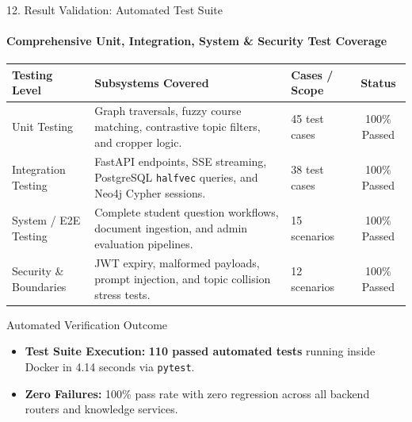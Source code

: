 \documentclass[aspectratio=169, 11pt]{beamer}
\begin{document}
\begin{frame}{12. Result Validation: Automated Test Suite}
    \framesubtitle{Comprehensive Unit, Integration, System \& Security Test Coverage}
    \begin{table}
        \centering
        \footnotesize
        \renewcommand{\arraystretch}{1.20}
        \begin{tabular}{p{2.8cm} p{4.6cm} p{2.6cm} c}
            \toprule
            \textbf{Testing Level} & \textbf{Subsystems Covered} & \textbf{Cases / Scope} & \textbf{Status} \\
            \midrule
            Unit Testing & Graph traversals, fuzzy course matching, contrastive topic filters, and cropper logic. & 45 test cases & 100\% Passed \\
            Integration Testing & FastAPI endpoints, SSE streaming, PostgreSQL \texttt{halfvec} queries, and Neo4j Cypher sessions. & 38 test cases & 100\% Passed \\
            System / E2E Testing & Complete student question workflows, document ingestion, and admin evaluation pipelines. & 15 scenarios & 100\% Passed \\
            Security \& Boundaries & JWT expiry, malformed payloads, prompt injection, and topic collision stress tests. & 12 scenarios & 100\% Passed \\
            \bottomrule
        \end{tabular}
    \end{table}

    \begin{block}{Automated Verification Outcome}
        \footnotesize
        \begin{itemize}
            \item \textbf{Test Suite Execution:} \textbf{110 passed automated tests} running inside Docker in 4.14 seconds via \texttt{pytest}.
            \item \textbf{Zero Failures:} 100\% pass rate with zero regression across all backend routers and knowledge services.
        \end{itemize}
    \end{block}
\end{frame}
\end{document}
